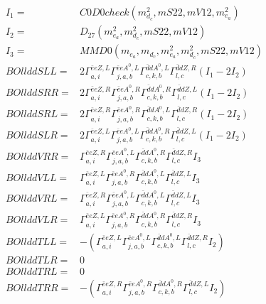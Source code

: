 \documentclass[A4,landscape]{article}
\begin{document}
\begin{align} 
I_1 = & C0D0check(m^2_{d_{{c}}}, mS22, mV12, m^2_{e_{{a}}}) \\ 
I_2 = & D_{27}(m^2_{e_{{a}}}, m^2_{d_{{c}}}, mS22, mV12) \\ 
I_3 = & MMD0(m_{e_{{a}}}, m_{d_{{c}}}, m^2_{e_{{a}}}, m^2_{d_{{c}}}, mS22, mV12) \\ 
  BOllddSLL= & 2  \Gamma^{\bar{e}e Z ,L}_{a, i} \Gamma^{\bar{e}e A^0 ,L}_{j, a, b} \Gamma^{\bar{d}d A^0 ,L}_{c, k, b} \Gamma^{\bar{d}d Z ,R}_{l, c} (I_1 - 2 I_2) \\ 
  BOllddSRR= & 2  \Gamma^{\bar{e}e Z ,R}_{a, i} \Gamma^{\bar{e}e A^0 ,R}_{j, a, b} \Gamma^{\bar{d}d A^0 ,R}_{c, k, b} \Gamma^{\bar{d}d Z ,L}_{l, c} (I_1 - 2 I_2) \\ 
  BOllddSRL= & 2  \Gamma^{\bar{e}e Z ,R}_{a, i} \Gamma^{\bar{e}e A^0 ,R}_{j, a, b} \Gamma^{\bar{d}d A^0 ,L}_{c, k, b} \Gamma^{\bar{d}d Z ,R}_{l, c} (I_1 - 2 I_2) \\ 
  BOllddSLR= & 2  \Gamma^{\bar{e}e Z ,L}_{a, i} \Gamma^{\bar{e}e A^0 ,L}_{j, a, b} \Gamma^{\bar{d}d A^0 ,R}_{c, k, b} \Gamma^{\bar{d}d Z ,L}_{l, c} (I_1 - 2 I_2) \\ 
  BOllddVRR= &  \Gamma^{\bar{e}e Z ,R}_{a, i} \Gamma^{\bar{e}e A^0 ,L}_{j, a, b} \Gamma^{\bar{d}d A^0 ,R}_{c, k, b} \Gamma^{\bar{d}d Z ,R}_{l, c} I_3 \\ 
  BOllddVLL= &  \Gamma^{\bar{e}e Z ,L}_{a, i} \Gamma^{\bar{e}e A^0 ,R}_{j, a, b} \Gamma^{\bar{d}d A^0 ,L}_{c, k, b} \Gamma^{\bar{d}d Z ,L}_{l, c} I_3 \\ 
  BOllddVRL= &  \Gamma^{\bar{e}e Z ,R}_{a, i} \Gamma^{\bar{e}e A^0 ,L}_{j, a, b} \Gamma^{\bar{d}d A^0 ,L}_{c, k, b} \Gamma^{\bar{d}d Z ,L}_{l, c} I_3 \\ 
  BOllddVLR= &  \Gamma^{\bar{e}e Z ,L}_{a, i} \Gamma^{\bar{e}e A^0 ,R}_{j, a, b} \Gamma^{\bar{d}d A^0 ,R}_{c, k, b} \Gamma^{\bar{d}d Z ,R}_{l, c} I_3 \\ 
  BOllddTLL= & -( \Gamma^{\bar{e}e Z ,L}_{a, i} \Gamma^{\bar{e}e A^0 ,L}_{j, a, b} \Gamma^{\bar{d}d A^0 ,L}_{c, k, b} \Gamma^{\bar{d}d Z ,R}_{l, c} I_2) \\ 
  BOllddTLR= & 0 \\ 
  BOllddTRL= & 0 \\ 
  BOllddTRR= & -( \Gamma^{\bar{e}e Z ,R}_{a, i} \Gamma^{\bar{e}e A^0 ,R}_{j, a, b} \Gamma^{\bar{d}d A^0 ,R}_{c, k, b} \Gamma^{\bar{d}d Z ,L}_{l, c} I_2) \\ 
\end{align} 
\end{document}
